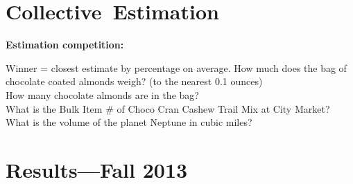 

\section{Collective\ Estimation}




  \textbf{Estimation competition:}
    
     
      Winner = closest estimate by percentage on average.
     {How much does the bag of chocolate coated almonds weigh?
        (to the nearest 0.1 ounces)}\\
      {}
     {How many chocolate almonds are in the bag?}\\
      {}
     {What is the Bulk Item \# of Choco Cran Cashew
        Trail Mix at City Market?}\\
      {}
     {What is the volume of the planet Neptune in cubic miles?}\\
      {}
    
  
  

\section{Results---Fall 2013}


